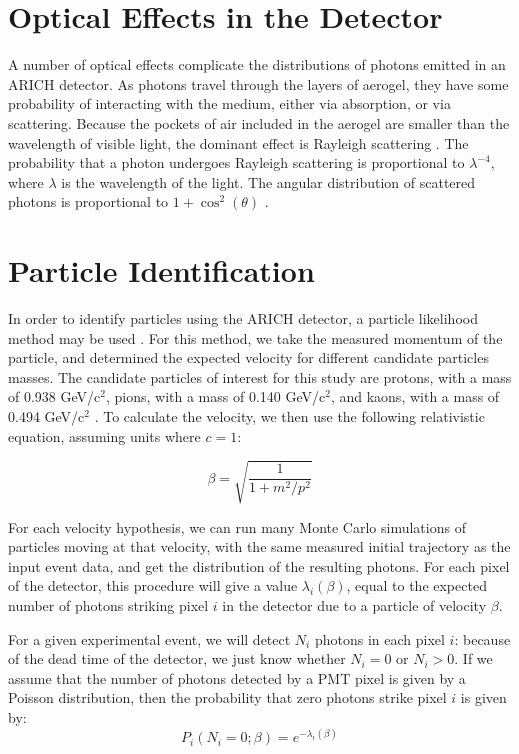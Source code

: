 \section{Optical Effects in the Detector}
\label{sec:optics}
A number of optical effects complicate the distributions of photons emitted in an ARICH detector.
As photons travel through the layers of aerogel, they have some probability of interacting with the medium, either via absorption, or via scattering.
Because the pockets of air included in the aerogel are smaller than the wavelength of visible light, the dominant effect is Rayleigh scattering \cite{aerogelRefraction}. 
The probability that a photon  undergoes Rayleigh scattering is proportional to $\lambda^{-4}$, where $\lambda$ is the wavelength of the light.
The angular distribution of scattered photons is proportional to $1 + \cos^2(\theta)$ \cite{rayleigh}.

\section{Particle Identification}
\label{sec:particleIdentification}
In order to identify particles using the ARICH detector, a particle likelihood method may be used \cite{richImpact, belleArich}.
For this method, we take the measured momentum of the particle, and determined the expected velocity for different candidate particles masses.
The candidate particles of interest for this study are protons, with a mass of 0.938 GeV/c$^2$, pions, with a mass of 0.140 GeV/c$^2$, and kaons, with a mass of 0.494 GeV/c$^2$ \cite{pdg2018}.
To calculate the velocity, we then use the following relativistic equation, assuming units where $c = 1$:

\begin{equation}
\label{eq:relMass}
 \beta = \sqrt{\frac{1}{1 +m^2 / p^2}}
\end{equation}

For each velocity hypothesis, we can run many Monte Carlo simulations of particles moving at that velocity, with the same measured initial trajectory as the input event data, and get the distribution of the resulting photons.
For each pixel of the detector, this procedure will give a value $\lambda_i(\beta)$, equal to the expected number of photons striking pixel $i$ in the detector due to a particle of velocity $\beta$. 

For a given experimental event, we will detect $N_i$ photons in each pixel $i$: because of the dead time of the detector,  we just know whether $N_i = 0$ or $N_i > 0$.
If we assume that the number of photons detected by a PMT pixel is given by a Poisson distribution, then the probability that zero photons strike pixel $i$ is given by:
\begin{equation}
P_i(N_i=0; \beta) = e^{-\lambda_i(\beta)}
\end{equation}

